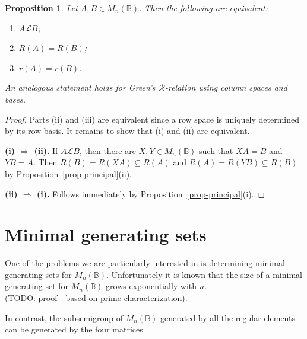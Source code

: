 \documentclass[11pt]{article}
\newtheorem{prop}[thm]{Proposition}
\numberwithin{equation}{section}
\newcommand{\B}{\mathbb{B}}
\newcommand{\Bn}{M_n(\B)}
\renewcommand{\L}{\mathscr{L}}
\newcommand{\R}{\mathscr{R}}
\begin{document}

\begin{prop} 
  Let $A, B \in \Bn$. Then the following are equivalent:
  \begin{enumerate}[\rm (i)]
    \item 
      $A \L B$;

    \item 
      $R(A) = R(B)$;

    \item 
      $r(A) = r(B)$.
  \end{enumerate}
  An analogous statement holds for Green's $\R$-relation using column spaces
  and bases. 
\end{prop}
\begin{proof}
  Parts (ii) and (iii) are equivalent since a row space is uniquely determined
  by its row basis. It remains to show that (i) and (ii) are
  equivalent.\bigskip

  \textbf{(i) $\Rightarrow$ (ii).} 
  If $A \L B$, then there are 
  $X, Y \in \Bn$ such that $XA = B$ and $YB = A$. Then $R(B) = R(XA) \subseteq
  R(A)$ and $R(A) = R(YB) \subseteq R(B)$ by
  Proposition~\ref{prop-principal}(ii).
  \bigskip

  \textbf{(ii) $\Rightarrow$ (i).} Follows immediately by
  Proposition~\ref{prop-principal}(i). 
\end{proof}


\section{Minimal generating sets}

One of the problems we are particularly interested in is determining minimal
generating sets for $\Bn$. Unfortunately it is known that the size of a minimal
generating set for $\Bn$ grows exponentially with $n$. \\
(TODO: proof - based on prime characterization).

In contrast, the subsemigroup of $\Bn$ generated by all the regular elements can
be generated by the four matrices \cite{Roush1977}
\end{document}
